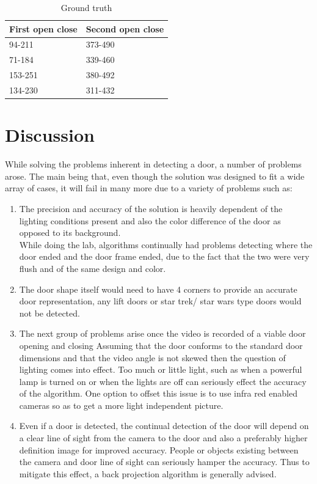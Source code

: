 \documentclass{article}
\begin{document}
\begin{table}[H]
	\centering
	\caption{Ground truth}
	\label{my-label}
	\begin{tabular}{|l|l|}
		\hline
		First open close & Second open close \\ \hline
		94-211           & 373-490           \\ \hline
		71-184           & 339-460           \\ \hline
		153-251          & 380-492           \\ \hline
		134-230          & 311-432           \\ \hline
	\end{tabular}
\end{table}


\section{Discussion}\label{sec:intro}
While solving the problems inherent in detecting a door, a number of problems arose. The main being that, even though the solution was designed to fit a wide array of cases, it will fail in many more due to a variety of problems such as:

\begin{enumerate}
	\item The precision and accuracy of the solution is heavily dependent of the lighting conditions present and also the color difference of the door as opposed to its background.\\ While doing the lab, algorithms continually had problems detecting where the door ended and the door frame ended, due to the fact that the two were very flush and of the same design and color.
	\item The door shape itself would need to have 4 corners to provide an accurate door representation, any lift doors or star trek/ star wars type doors would not be detected. 
	
	\item The next group of problems arise once the video is recorded of a viable door opening and closing Assuming that the door conforms to the standard door dimensions and that the video angle is not skewed then the question of lighting comes into effect. Too much or little light, such as when a powerful lamp is turned on or when the lights are off can seriously effect the accuracy of the algorithm. One option to offset this issue is to use infra red enabled cameras so as to get a more light independent picture.
	
	\item Even if a door is detected, the continual detection of the door will depend on a clear line of sight from the camera to the door and also a preferably higher definition image for improved accuracy. People or objects existing between the camera and door line of sight can seriously hamper the accuracy. Thus to mitigate this effect, a back projection algorithm is generally advised.
	
	
\end{enumerate}
\end{document}
